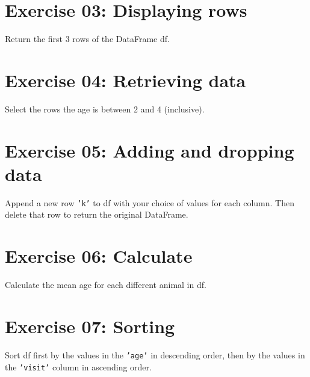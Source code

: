 \documentclass{42-en}
\begin{document}


\chapter{Exercise 03:  Displaying rows}
\makeheaderfiles

Return the first 3 rows of the DataFrame df.

\nextexercice
\newpage



\chapter{Exercise 04:  Retrieving data}
\makeheaderfiles
Select the rows the age is between 2 and 4 (inclusive).\\
\nextexercice
\newpage



\chapter{Exercise 05: Adding and dropping data}
\makeheaderfiles

Append a new row \texttt{'k'} to df with your choice of values for each column. Then delete that row to return the original DataFrame.\\

\nextexercice
\newpage




\chapter{Exercise 06: Calculate}
\makeheaderfiles
Calculate the mean age for each different animal in df.\\
\nextexercice
\newpage



\chapter{Exercise 07:  Sorting}
\makeheaderfiles
Sort df first by the values in the \texttt{'age'} in descending order, then by the values in the \texttt{'visit'} column in ascending order.\\
\end{document}
